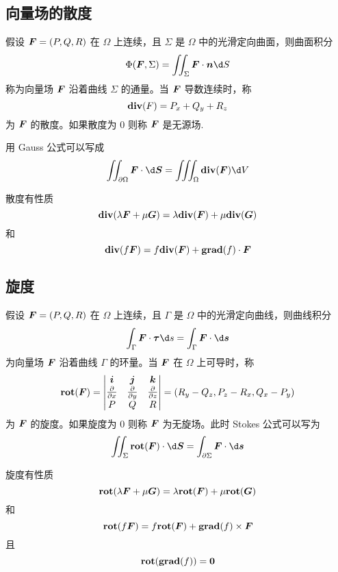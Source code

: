 \subsection{向量场的散度}

\newcommand{\vdiv}{\operatorname{div}}

假设 $\boldsymbol{F} = (P, Q, R)$ 在 $\Omega$ 上连续，且 $\Sigma$ 是 $\Omega$ 中的光滑定向曲面，则曲面积分
\[ \Phi(\vbf{F}, \Sigma) = \iint_{\Sigma} \vbf{F} \cdot \vbf{n} \d S \]
称为向量场 $\boldsymbol{F}$ 沿着曲线 $\Sigma$ 的通量。当 $\boldsymbol{F}$ 导数连续时，称
\[ \vbf{\vdiv}(F) = P_x + Q_y + R_z \]
为 $\boldsymbol{F}$ 的散度。如果散度为 $0$ 则称 $\boldsymbol{F}$ 是无源场.

用 Gauss 公式可以写成
\[ \iint_{\partial \Omega} \vbf{F} \cdot \d \vbf{S} = \iiint_{\Omega} \vbf{\vdiv}(\vbf{F}) \d V \]

散度有性质
\[ \vbf{\vdiv}(\lambda \vbf{F} + \mu \vbf{G}) = \lambda \vbf{\vdiv}(\vbf{F}) + \mu \vbf{\vdiv}(\vbf{G}) \]
和
\[ \vbf{\vdiv}(f \vbf{F}) = f \vbf{\vdiv}(\vbf{F}) + \vbf{\grad}(f) \cdot \vbf{F}  \]

\subsection{旋度}

\newcommand{\rot}{\operatorname{rot}}

假设 $\boldsymbol{F} = (P, Q, R)$ 在 $\Omega$ 上连续，且 $\Gamma$ 是 $\Omega$ 中的光滑定向曲线，则曲线积分
\[ \int_{\Gamma} \vbf{F} \cdot \vbf{\tau} \d s = \int_{\Gamma} \vbf{F} \cdot \d \vbf{s} \]
为向量场 $\boldsymbol{F}$ 沿着曲线 $\Gamma$ 的环量。当 $\boldsymbol{F}$ 在 $\Omega$ 上可导时，称
\[ \vbf{\rot}(\vbf{F}) = \left|\begin{matrix}
		\vbf{i}                     & \vbf{j}                     & \vbf{k}                     \\
		\frac{\partial}{\partial x} & \frac{\partial}{\partial y} & \frac{\partial}{\partial z} \\
		P                           & Q                           & R
	\end{matrix}\right| = (R_y - Q_z, P_z - R_x, Q_x - P_y) \]
为 $\boldsymbol{F}$ 的旋度。如果旋度为 $0$ 则称 $\boldsymbol{F}$ 为无旋场。此时 Stokes 公式可以写为
\[ \iint_{\Sigma} \vbf{\rot}(\vbf{F}) \cdot \d \vbf{S} = \int_{\partial \Sigma} \vbf{F} \cdot \d \vbf{s} \]

旋度有性质
\[ \vbf{\rot}(\lambda \vbf{F} + \mu \vbf{G}) = \lambda \vbf{\rot}(\vbf{F}) + \mu \vbf{\rot}(\vbf{G}) \]
和
\[ \vbf{\rot}(f \vbf{F}) = f \vbf{\rot}(\vbf{F}) + \vbf{\grad}(f) \times \vbf{F}  \]
且
\[ \vbf{\rot}(\vbf{\grad}(f)) = \vbf{0} \]

